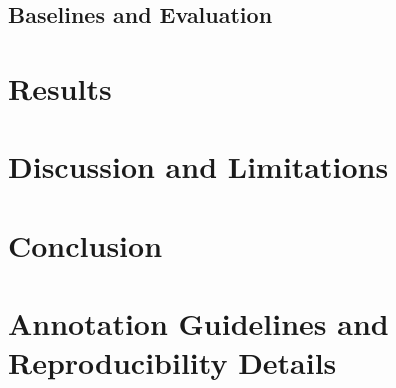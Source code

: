 \documentclass[11pt]{article}
\begin{document}
\subsection{Baselines and Evaluation}

\section{Results}

\section{Discussion and Limitations}

\section{Conclusion}




\appendix
\section{Annotation Guidelines and Reproducibility Details}
\end{document}
